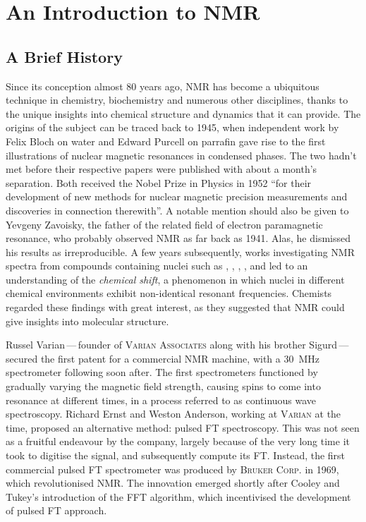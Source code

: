 \section{An Introduction to \acs{NMR}}

\subsection{A Brief History}
Since its conception almost 80 years ago, \ac{NMR} has become a ubiquitous
technique in chemistry, biochemistry and numerous other disciplines, thanks to
the unique insights into chemical structure and dynamics that it
can provide.
The origins of the subject can be traced back to 1945, when independent work by
Felix Bloch on water\cite{Bloch1946} and Edward Purcell on
parrafin\cite{Purcell1946} gave rise to the first illustrations of nuclear
magnetic resonances in condensed phases. The two hadn't met before their
respective papers were published with about a month's
separation\cite{Becker1993}. Both received the Nobel Prize in Physics in 1952
``for their development of new methods for nuclear magnetic precision
measurements and discoveries in connection therewith''\cite{Nobel1952}. A
notable mention should also be given
to Yevgeny Zavoisky, the father of the related field of electron paramagnetic
resonance, who probably observed NMR as far back as 1941\cite{Eaton1998}. Alas,
he dismissed
his results as irreproducible. A few years subsequently, works investigating
\ac{NMR} spectra from compounds containing nuclei such as ,
, , , and  led to an
understanding of the \emph{chemical shift}, a phenomenon in
which nuclei in different chemical environments exhibit
non-identical resonant frequencies\cite{Knight1949, Proctor1950,
Dickinson1950}.  Chemists regarded these findings with great
interest, as they suggested that \ac{NMR} could give insights into molecular
structure.

Russel Varian\,---\,founder of \textsc{Varian Associates} along with his brother
Sigurd\,---\,
secured the first patent for a commercial \ac{NMR} machine, with
a \qty{30}{\mega\hertz} spectrometer following soon after. The first
spectrometers functioned by gradually varying the magnetic field strength,
causing spins to come into resonance at different times, in a process referred
to as continuous wave spectroscopy. Richard Ernst and
Weston Anderson, working at \textsc{Varian} at the time, proposed an alternative
method: pulsed \ac{FT} spectroscopy\cite{Ernst1966}. This was not seen as a
fruitful endeavour by the company, largely because of the very long time it
took to digitise the signal, and subsequently compute its FT\cite{Freeman2015}.
Instead, the first commercial pulsed \ac{FT} spectrometer was produced by
\textsc{Bruker Corp.} in 1969, which revolutionised NMR. The innovation emerged
shortly after Cooley and Tukey's introduction of the \ac{FFT}
algorithm\cite{Cooley1965}, which incentivised the development of pulsed
\ac{FT} approach.

